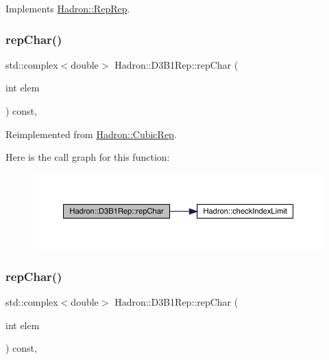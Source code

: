 Implements \mbox{\hyperlink{structHadron_1_1RepRep_ab3213025f6de249f7095892109575fde}{Hadron\+::\+Rep\+Rep}}.

\mbox{\label{structHadron_1_1D3B1Rep_a3a5bf413079f99bedafb7134af0e5af1}} 
\subsubsection{\texorpdfstring{repChar()}{repChar()}\hspace{0.1cm}{\footnotesize\ttfamily [1/3]}}
{\footnotesize\ttfamily std\+::complex$<$double$>$ Hadron\+::\+D3\+B1\+Rep\+::rep\+Char (\begin{DoxyParamCaption}\item[{int}]{elem }\end{DoxyParamCaption}) const\hspace{0.3cm}{\ttfamily [inline]}, {\ttfamily [virtual]}}



Reimplemented from \mbox{\hyperlink{structHadron_1_1CubicRep_af45227106e8e715e84b0af69cd3b36f8}{Hadron\+::\+Cubic\+Rep}}.

Here is the call graph for this function\+:
\nopagebreak
\begin{figure}[H]
\begin{center}
\leavevmode
\includegraphics[width=350pt]{de/dc2/structHadron_1_1D3B1Rep_a3a5bf413079f99bedafb7134af0e5af1_cgraph}
\end{center}
\end{figure}
\mbox{\label{structHadron_1_1D3B1Rep_a3a5bf413079f99bedafb7134af0e5af1}} 
\subsubsection{\texorpdfstring{repChar()}{repChar()}\hspace{0.1cm}{\footnotesize\ttfamily [2/3]}}
{\footnotesize\ttfamily std\+::complex$<$double$>$ Hadron\+::\+D3\+B1\+Rep\+::rep\+Char (\begin{DoxyParamCaption}\item[{int}]{elem }\end{DoxyParamCaption}) const\hspace{0.3cm}{\ttfamily [inline]}, {\ttfamily [virtual]}}



